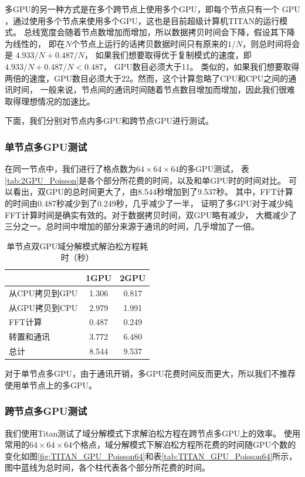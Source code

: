 多GPU的另一种方式是在多个跨节点上使用多个GPU，即每个节点只有一个 GPU ，通过使用多个节点来使用多个GPU，这也是目前超级计算机TITAN的运行模式。
总线宽度会随着节点数增加而增加，所以数据拷贝时间会下降，假设其下降为线性的，
即在$N$个节点上运行的话拷贝数据时间只有原来的$1/N$，则总时间将会是 $4.933/N+0.487/N$，
如果我们想要取得优于复制模式的速度，即 $4.933/N+0.487/N<0.487$， GPU数目必须大于11。
类似的，如果我们想要取得两倍的速度，GPU数目必须大于22。然而，这个计算忽略了CPU和CPU之间的通讯时间，
一般来说，节点间的通讯时间随着节点数目增加而增加，因此我们很难取得理想情况的加速比。

下面，我们分别对节点内多GPU和跨节点GPU进行测试。

\subsubsection{单节点多GPU测试}
在同一节点中，我们进行了格点数为$64 \times 64 \times 64$的多GPU测试，
表\eqref{tab:2GPU_Poisson}是各个部分所花费的时间，以及和单GPU时的时间对比。
可以看出，双GPU的总时间更大了，由8.544秒增加到了9.537秒。
其中，FFT计算的时间由0.487秒减少到了0.249秒，几乎减少了一半，
证明了多GPU对于减少纯FFT计算时间是确实有效的。对于数据拷贝时间，双GPU略有减少，
大概减少了三分之一。总时间中增加的部分来源于通讯的时间，几乎增加了一倍。
\begin{table}[!htbp]
    \centering
    \footnotesize%
    \setlength{\tabcolsep}{4pt}%
    \renewcommand{\arraystretch}{1.2}%
    \caption{单节点双GPU域分解模式解泊松方程耗时（秒）}
    \begin{tabular}{lcc}
        \hline\hline
                          & 1GPU    & 2GPU   \\
        \hline\hline
        从CPU拷贝到GPU    & 1.306   & 0.817  \\
        \hline
        从GPU拷贝到CPU    & 2.979   & 1.991  \\
        \hline
        FFT计算           & 0.487   & 0.249  \\
        \hline
        转置和通讯        & 3.772   & 6.480  \\
        \hline
        总计              & 8.544   & 9.537  \\
        \hline\hline
    \end{tabular}
    \label{tab:2GPU_Poisson}
\end{table}
对于单节点多GPU，由于通讯开销，多GPU花费时间反而更大，所以我们不推荐使用单节点上的多GPU。

\subsubsection{跨节点多GPU测试}
我们使用Titan测试了域分解模式下求解泊松方程在跨节点多GPU上的效率。
使用常用的$64 \times 64 \times 64$个格点，域分解模式下解泊松方程所花费的时间随GPU个数的变化如图\eqref{fig:TITAN_GPU_Poisson64}和表\eqref{tab:TITAN_GPU_Poisson64}所示，图中蓝线为总时间，各个柱代表各个部分所花费的时间。

